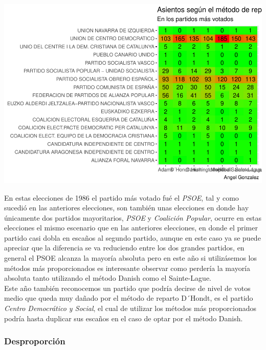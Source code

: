 \documentclass[12pt,a4paper,]{book}
\numberwithin{dummy}{section}
\theoremstyle{ocrenumbox}
\theoremstyle{blacknumex}
\theoremstyle{blacknumbox}
\theoremstyle{ocrenum}
\theoremstyle{ocrenum}
\begin{document}
\begin{center}\includegraphics[width=1\linewidth]{figurasR/unnamed-chunk-14-2} \end{center}

En estas elecciones de 1986 el partido más votado fué el \emph{PSOE},
tal y como sucedió en las anteriores elecciones, son también unas
elecciones en donde hay únicamente dos partidos mayoritarios,
\emph{PSOE} y \emph{Coalición Popular}, ocurre en estas elecciones el
mismo escenario que en las anteriores elecciones, en donde el primer
partido casi dobla en escaños al segundo partido, aunque en este caso ya
se puede apreciar que la diferencia se va reduciendo entre los dos
grandes partidos, en general el PSOE alcanza la mayoría absoluta pero en
este año si utilizásemos los métodos más proporcionados es interesante
observar como perdería la mayoría absoluta tanto utilizando el método
Danish como el Sainte-Lague.\\
Este año también reconocemos un partido que podría decirse de nivel de
votos medio que queda muy dañado por el método de reparto D´Hondt, es el
partido \emph{Centro Democrático y Social}, el cual de utilizar los
métodos más proporcionados podría hasta duplicar sus escaños en el caso
de optar por el método Danish.

\hypertarget{desproporciuxf3n-3}{%
\subsubsection{Desproporción}\label{desproporciuxf3n-3}}
\end{document}
